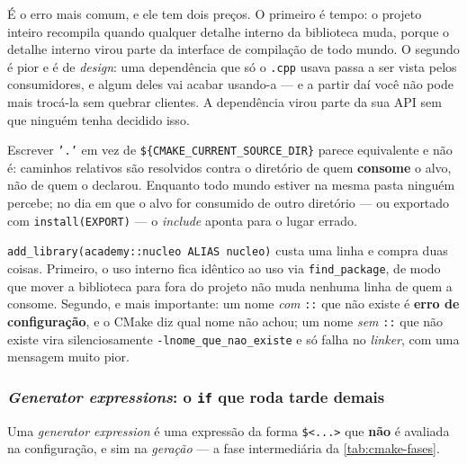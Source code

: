 \begin{armadilha}
É o erro mais comum, e ele tem dois preços. O primeiro é tempo: o projeto
inteiro recompila quando qualquer detalhe interno da biblioteca muda, porque o
detalhe interno virou parte da interface de compilação de todo mundo. O segundo
é pior e é de \emph{design}: uma dependência que só o \texttt{.cpp} usava passa
a ser vista pelos consumidores, e algum deles vai acabar usando-a --- e a partir
daí você não pode mais trocá-la sem quebrar clientes. A dependência virou parte
da sua API sem que ninguém tenha decidido isso.
\end{armadilha}

\begin{armadilha}
Escrever \texttt{'.'} em vez de \texttt{\$\{CMAKE\_CURRENT\_SOURCE\_DIR\}}
parece equivalente e não é: caminhos relativos são resolvidos contra o
diretório de quem \textbf{consome} o alvo, não de quem o declarou. Enquanto
todo mundo estiver na mesma pasta ninguém percebe; no dia em que o alvo for
consumido de outro diretório --- ou exportado com \texttt{install(EXPORT)} ---
o \emph{include} aponta para o lugar errado.
\end{armadilha}

\begin{regra}
\texttt{add\_library(academy::nucleo ALIAS nucleo)} custa uma linha e compra
duas coisas. Primeiro, o uso interno fica idêntico ao uso via
\texttt{find\_package}, de modo que mover a biblioteca para fora do projeto não
muda nenhuma linha de quem a consome. Segundo, e mais importante: um nome
\emph{com} \texttt{::} que não existe é \textbf{erro de configuração}, e o CMake
diz qual nome não achou; um nome \emph{sem} \texttt{::} que não existe vira
silenciosamente \texttt{-lnome\_que\_nao\_existe} e só falha no \emph{linker},
com uma mensagem muito pior.
\end{regra}

\subsubsection{\emph{Generator expressions}: o \texttt{if} que roda tarde demais}

Uma \emph{generator expression} é uma expressão da forma \texttt{\$<...>} que
\textbf{não} é avaliada na configuração, e sim na \emph{geração} --- a fase
intermediária da \cref{tab:cmake-fases}.

